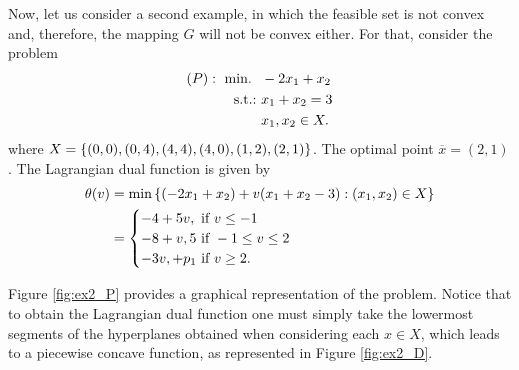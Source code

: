Now, let us consider a second example, in which the feasible set is not convex and, therefore, the mapping $G$ will not be convex either. For that, consider the problem
%
\begin{align*}
	(P):~ \mathop{\text{min.~}} \ & -2x_1 + x_2 \\
	\mathop{\text{s.t.:~}} & x_1 + x_2 = 3 \\
	& x_1, x_2 \in X.
\end{align*}
%
where $X = \left\{ (0,0), (0,4), (4,4), (4,0), (1,2), (2,1) \right \}$. The optimal point $\overline{x} = (2,1)$. The Lagrangian dual function is given by
\begin{align*} 
	\theta(v) & = \min \left\{  (-2x_1 + x_2) + v(x_1 + x_2 - 3) : (x_1, x_2) \in X \right \} \\
	& = \begin{cases}
	     -4 + 5v, \text{ if } v \leq -1 \\
	     -8 + v, 5 \text{ if }  -1 \leq v \leq 2 \\
	     -3v, + p_1 \text{ if } v \geq 2. 
	 \end{cases}
\end{align*} 

Figure \ref{fig:ex2_P} provides a graphical representation of the problem. Notice that to obtain the Lagrangian dual function one must simply take the lowermost segments of the hyperplanes obtained when considering each $x \in X$, which leads to a piecewise concave function, as represented in Figure \ref{fig:ex2_D}. 

